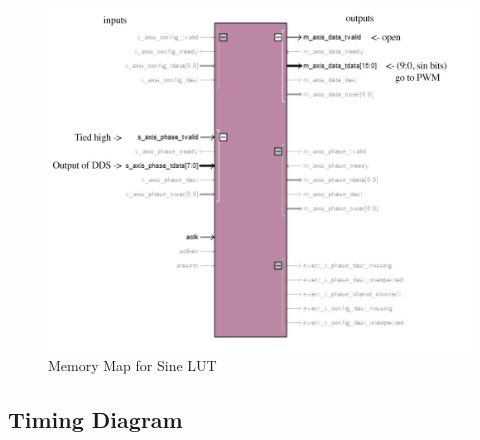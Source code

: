 \documentclass{article}
\begin{document}
      \begin{figure}[H]
        \centering
        \includegraphics[width=6.5in]{img/memorymap.jpg}
        \caption{Memory Map for Sine LUT}
      \end{figure}

  \newpage
	\subsection{Timing Diagram}
\end{document}
